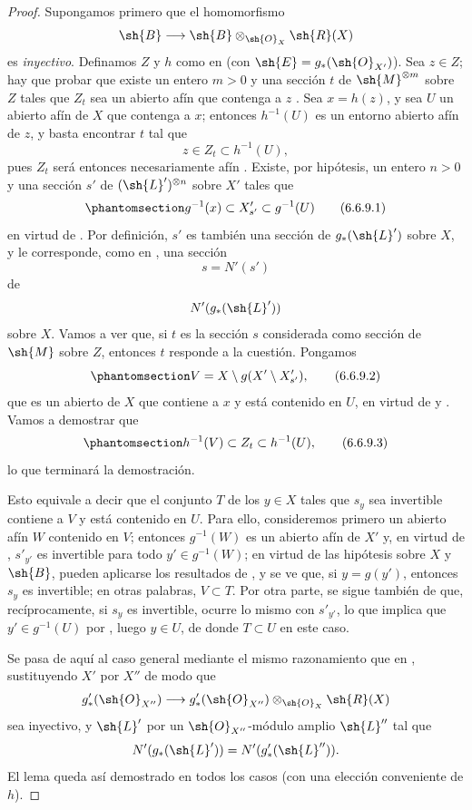 \documentclass[oneside,10pt]{amsart}
\makeatletter
\newcommand{\ega@arrow}[2]{\mathchoice{#1}{#2}{#2}{#2}}
\renewcommand{\to}{\ega@arrow{\longrightarrow}{\rightarrow}}
\newcommand{\oldpage}[2][]{\marginnote{\normalfont\footnotesize\textbf{#1}~|~#2}\ignorespaces}
\let\EGAOriginalLabel\label
\renewcommand{\label}[1]{\phantomsection\EGAOriginalLabel{#1}}
\makeatother
\begin{document}
\begin{proof}
Supongamos primero que el homomorfismo
\[
  \sh{B}\to\sh{B}\otimes_{\sh{O}_X}\sh{R}(X)
\]
es \emph{inyectivo}.
Definamos $Z$ y $h$ como en  (con $\sh{E}=g_*(\sh{O}_{X'})$).
Sea $z\in Z$;
hay que probar que existe un entero $m>0$ y una sección $t$ de $\sh{M}^{\otimes m}$ sobre $Z$ tales que $Z_t$ sea un abierto afín que contenga a $z$ .
Sea $x=h(z)$, y sea $U$ un abierto afín de $X$ que contenga a $x$;
entonces $h^{-1}(U)$ es un entorno abierto afín de $z$, y basta encontrar $t$ tal que
\[
  z\in Z_t\subset h^{-1}(U),
\]
pues $Z_t$ será entonces necesariamente afín .
Existe, por hipótesis, un entero $n>0$ y una sección $s'$ de $({\sh{L}'})^{\otimes n}$ sobre $X'$ tales que
\[
\label{II.6.6.9.1}
  g^{-1}(x)\subset X'_{s'}\subset g^{-1}(U)
\tag{6.6.9.1}
\]
en virtud de .
Por definición, $s'$ es también una sección de $g_*(\sh{L}')$ sobre $X$, y le corresponde, como en , una sección
\[
  s=N'(s')
\]
de
\[
  N'(g_*(\sh{L}'))
\]
sobre $X$.
\oldpage[II]{134}
Vamos a ver que, si $t$ es la sección $s$ considerada como sección de $\sh{M}$ sobre $Z$, entonces $t$ responde a la cuestión.
Pongamos
\[
\label{II.6.6.9.2}
  V=X\setminus g(X'\setminus X'_{s'}),
\tag{6.6.9.2}
\]
que es un abierto de $X$ que contiene a $x$ y está contenido en $U$, en virtud de  y .
Vamos a demostrar que
\[
\label{II.6.6.9.3}
  h^{-1}(V)\subset Z_t\subset h^{-1}(U),
\tag{6.6.9.3}
\]
lo que terminará la demostración.

Esto equivale a decir que el conjunto $T$ de los $y\in X$ tales que $s_y$ sea invertible contiene a $V$ y está contenido en $U$.
Para ello, consideremos primero un abierto afín $W$ contenido en $V$;
entonces $g^{-1}(W)$ es un abierto afín de $X'$ y, en virtud de , $s'_{y'}$ es invertible para todo $y'\in g^{-1}(W)$;
en virtud de las hipótesis sobre $X$ y $\sh{B}$, pueden aplicarse los resultados de , y se ve que, si $y=g(y')$, entonces $s_y$ es invertible;
en otras palabras, $V\subset T$.
Por otra parte, se sigue también de  que, recíprocamente, si $s_y$ es invertible, ocurre lo mismo con $s'_{y'}$, lo que implica que $y'\in g^{-1}(U)$ por , luego $y\in U$, de donde $T\subset U$ en este caso.

Se pasa de aquí al caso general mediante el mismo razonamiento que en , sustituyendo $X'$ por $X''$ de modo que
\[
  g'_*(\sh{O}_{X''})\to
  g'_*(\sh{O}_{X''})\otimes_{\sh{O}_X}\sh{R}(X)
\]
sea inyectivo, y $\sh{L}'$ por un $\sh{O}_{X''}$-módulo amplio $\sh{L}''$ tal que
\[
  N'(g_*(\sh{L}'))=N'(g'_*(\sh{L}'')).
\]
El lema  queda así demostrado en todos los casos (con una elección conveniente de $h$).
\end{proof}
\end{document}
